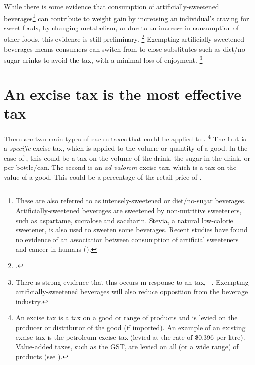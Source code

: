 \documentclass[embargoed]{grattan}
\begin{document}
While there is some evidence that consumption of artificially-sweetened beverages\footnote{These are also referred to as intensely-sweetened or diet/no-sugar beverages.
Artificially-sweetened beverages are sweetened by non-nutritive sweeteners, such as aspartame, sucralose and saccharin.
Stevia, a natural low-calorie sweetener, is also used to sweeten some beverages.
Recent studies have found no evidence of an association between consumption of artificial sweeteners and cancer in humans (\textcites{Institute2009ArtificialSweetenersCancer}{CancerCouncil2015Artificialsweetenersdo}).} can contribute to weight gain by increasing an individual's craving for sweet foods, by changing metabolism, or due to an increase in consumption of other foods, this evidence is still preliminary.%
\footcites{Mattes2009Nonnutritivesweetenerconsumption}{Popkin2012Sugarybeveragesrepresent}{Yang2010Gainweightgoing}{Swithers2013Artificialsweetenersproduce}{Green2012Alteredprocessingsweet}{Fowler2008Fuelingobesityepidemic}{Friedman2012Sugarsweetenedbeverage} Exempting artificially-sweetened beverages means consumers can switch from \SSBs{} to close substitutes such as diet/no-sugar drinks to avoid the \SSB{} tax, with a minimal loss of enjoyment.%
\footnote{There is strong evidence that this occurs in response to an \SSB{} tax, \eg~\textcites{Colchero2016Beveragepurchasesstores}{Briggs2013Overallincomespecific}{Sharma2014effectstaxingsugarsweetened}{Zhen2010Habitformationdemand}.
Exempting artificially-sweetened beverages will also reduce opposition from the beverage industry.}

\section{An excise tax is the most effective tax}\label{an-excise-tax-is-the-most-effective-tax}

There are two main types of excise taxes that could be applied to \SSBs{}.%
\footnote{An excise tax is a tax on a good or range of products and is levied on the producer or distributor of the good (if imported).
An example of an existing excise tax is the petroleum excise tax (levied at the rate of \$0.396 per litre).
Value-added taxes, such as the GST, are levied on all (or a wide range) of products (see \textcite{CnossenExcisetaxationAustralia}).} The first is a \emph{specific} excise tax, which is applied to the volume or quantity of a good.
In the case of \SSBs{}, this could be a tax on the volume of the drink, the sugar in the drink, or per bottle/can.
The second is an \emph{ad valorem} excise tax, which is a tax on the value of a good.
This could be a percentage of the retail price of \SSBs{}.
\end{document}
